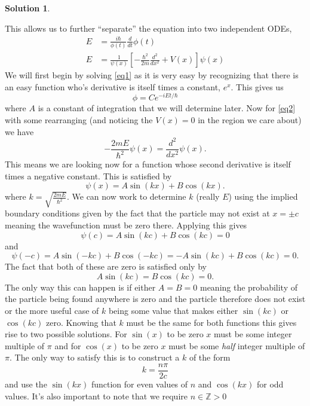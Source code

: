\documentclass[10pt]{article}
\theoremstyle{definition}
\newtheorem{soln}{Solution}
\begin{document}
\begin{soln}
\begin{enumerate}[label=(\alph*)]
          This allows us to further ``separate'' the equation into two independent ODEs,
          \begin{align}
            E & =\frac{i\hbar}{\phi(t)}\frac{d}{d t}\phi(t) \label{eq1}                                      \\
            E & =\frac{1}{\psi(x)}\left[-\frac{\hbar^2}{2m}\frac{d^2}{d x^2} + V(x)\right]\psi(x)\label{eq2}
          \end{align}
          We will first begin by solving \ref{eq1} as it is very easy by recognizing that there is an easy function who's derivative is itself times a constant, $e^x$.
          This gives us
          $$\phi=Ce^{-iEt/\hbar}$$
          where $A$ is a constant of integration that we will determine later.
          Now for \ref{eq2} with some rearranging (and noticing the $V(x)=0$ in the region we care about) we have
          $$-\frac{2mE}{\hbar^2}\psi(x)=\frac{d^2}{d x^2}\psi(x).$$
          This means we are looking now for a function whose second derivative is itself times a negative constant.
          This is satisfied by
          $$\psi(x)=A\sin\left(kx\right)+B\cos\left(kx\right).$$
          where $k=\sqrt{\frac{2mE}{\hbar^2}}$.
          We can now work to determine $k$ (really $E$) using the implied boundary conditions given by the fact that the particle may not exist at $x=\pm c$ meaning the wavefunction
          must be zero there. Applying this gives
          $$\psi(c)=A\sin\left(kc\right)+B\cos\left(kc\right)=0$$
          and
          $$\psi(-c)=A\sin\left(-kc\right)+B\cos\left(-kc\right)=-A\sin\left(kc\right)+B\cos\left(kc\right)=0.$$
          The fact that both of these are zero is satisfied only by
          $$A\sin\left(kc\right)=B\cos\left(kc\right)=0.$$
          The only way this can happen is if either $A=B=0$ meaning the probability of the particle being found anywhere is zero and the particle therefore does not exist
          or the more useful case of $k$ being some value that makes either $\sin\left(kc\right)$ or $\cos\left(kc\right)$ zero. Knowing that
          $k$ must be the same for both functions this gives rise to two possible solutions. For $\sin(x)$ to be zero $x$ must be some integer multiple of $\pi$ and
          for $\cos(x)$ to be zero $x$ must be some \emph{half} integer multiple of $\pi$. The only way to satisfy this is to construct a $k$ of the form
          $$k=\frac{n\pi}{2c}$$
          and use the $\sin(kx)$ function for even values of $n$ and $\cos(kx)$ for odd values. It's also important to note that we require $n\in \mathbb{Z}>0$

\end{enumerate}
\end{soln}
\end{document}
